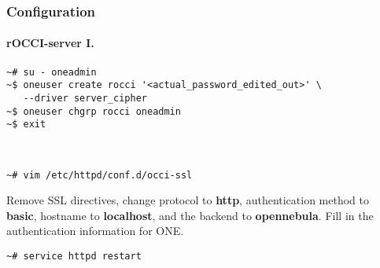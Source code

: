 \begin{frame}[fragile]
  \frametitle{Configuration}
  \framesubtitle{rOCCI-server I.}

  \begin{Sbox}
  \Fontsmaller
  \begin{minipage}{\linewidth-2\fboxsep-2\fboxrule-4pt}
  \color{white}
  \begin{verbatim}
~# su - oneadmin
~$ oneuser create rocci '<actual_password_edited_out>' \
   --driver server_cipher
~$ oneuser chgrp rocci oneadmin
~$ exit
  \end{verbatim}
  \end{minipage}
  \end{Sbox}

  \hfill \\

  \begin{Sbox}
  \Fontsmaller
  \begin{minipage}{\linewidth-2\fboxsep-2\fboxrule-4pt}
  \color{white}
  \begin{verbatim}
~# vim /etc/httpd/conf.d/occi-ssl
  \end{verbatim}
  \end{minipage}
  \end{Sbox}
  \fcolorbox{black}{black}{\TheSbox}

  \begin{center}
    Remove SSL directives, change protocol to \textbf{http}, authentication
    method to \textbf{basic}, hostname to \textbf{localhost}, and the backend
    to \textbf{opennebula}. Fill in the authentication information for ONE.
  \end{center}

  \begin{Sbox}
  \Fontsmaller
  \begin{minipage}{\linewidth-2\fboxsep-2\fboxrule-4pt}
  \color{white}
  \begin{verbatim}
~# service httpd restart
  \end{verbatim}
  \end{minipage}
  \end{Sbox}
\end{frame}


